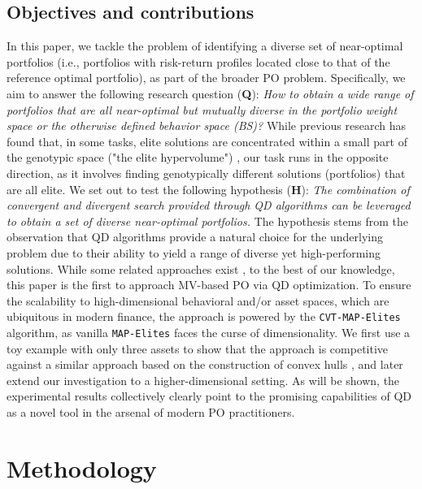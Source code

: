 \vspace{-0.3cm}

\subsection{Objectives and contributions}

In this paper, we tackle the problem of identifying a diverse set of near-optimal portfolios (i.e., portfolios with risk-return profiles located close to that of the reference optimal portfolio), as part of the broader PO problem. Specifically, we aim to answer the following research question (\textbf{Q}): \textit{How to obtain a wide range of portfolios that are all near-optimal but mutually diverse in the portfolio weight space or the otherwise defined behavior space (BS)?} While previous research has found that, in some tasks, elite solutions are concentrated within a small part of the genotypic space ("the elite hypervolume") \cite{vassila}, our task runs in the opposite direction, as it involves finding genotypically different solutions (portfolios) that are all elite. We set out to test the following hypothesis (\textbf{H}): \textit{The combination of convergent and divergent search provided through QD algorithms can be leveraged to obtain a set of diverse near-optimal portfolios.} The hypothesis stems from the observation that QD algorithms provide a natural choice for the underlying problem due to their ability to yield a range of diverse yet high-performing solutions. While some related approaches exist \cite{zhang,yuksel}, to the best of our knowledge, this paper is the first to approach MV-based PO via QD optimization. To ensure the scalability to high-dimensional behavioral and/or asset spaces, which are ubiquitous in modern finance, the approach is powered by the \verb|CVT-MAP-Elites| algorithm, as vanilla \verb|MAP-Elites| faces the curse of dimensionality. We first use a toy example with only three assets to show that the approach is competitive against a similar approach based on the construction of convex hulls \cite{schans}, and later extend our investigation to a higher-dimensional setting. As will be shown, the experimental results collectively clearly point to the promising capabilities of QD as a novel tool in the arsenal of modern PO practitioners.

\section{Methodology}

